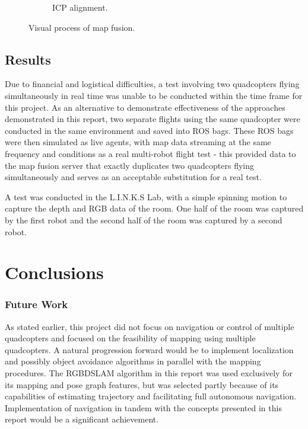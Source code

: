 \documentclass[letterpaper, oneside, 10pt]{report}
\begin{document}
\begin{figure}[h]
\begin{subfigure}[h]{0.31\textwidth}
        \caption{ICP alignment.}
        \label{fig:ICP alignment.}
    \end{subfigure}
    \caption{Visual process of map fusion.}
    \label{fig:Visual process of map fusion.}
\end{figure}

\section{Results}

Due to financial and logistical difficulties, a test involving two quadcopters flying simultaneously in real time was unable to be conducted within the time frame for this project. As an alternative to demonstrate effectiveness of the approaches demonstrated in this report, two separate flights using the same quadcopter were conducted in the same environment and saved into ROS bags. These ROS bags were then simulated as live agents, with map data streaming at the same frequency and conditions as a real multi-robot flight test - this provided data to the map fusion server that exactly duplicates two quadcopters flying simultaneously and serves as an acceptable substitution for a real test.

A test was conducted in the L.I.N.K.S Lab, with a simple spinning motion to capture the depth and RGB data of the room. One half of the room was captured by the first robot and the second half of the room was captured by a second robot.

\chapter{Conclusions}

\subsection{Future Work}

As stated earlier, this project did not focus on navigation or control of multiple quadcopters and focused on the feasibility of mapping using multiple quadcopters. A natural progression forward would be to implement localization and possibly object avoidance algorithms in parallel with the mapping procedures. The RGBDSLAM algorithm in this report was used exclusively for its mapping and pose graph features, but was selected partly because of its capabilities of estimating trajectory and facilitating full autonomous navigation. Implementation of navigation in tandem with the concepts presented in this report would be a significant achievement.
\end{document}
